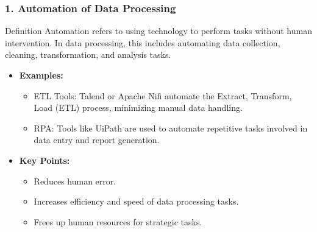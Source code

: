 \documentclass[aspectratio=169]{beamer}
\begin{document}
\begin{frame}[fragile]
    \frametitle{1. Automation of Data Processing}
    \begin{block}{Definition}
        Automation refers to using technology to perform tasks without human intervention. In data processing, this includes automating data collection, cleaning, transformation, and analysis tasks.
    \end{block}
    
    \begin{itemize}
        \item \textbf{Examples:}
        \begin{itemize}
            \item ETL Tools: Talend or Apache Nifi automate the Extract, Transform, Load (ETL) process, minimizing manual data handling.
            \item RPA: Tools like UiPath are used to automate repetitive tasks involved in data entry and report generation.
        \end{itemize}
        
        \item \textbf{Key Points:}
        \begin{itemize}
            \item Reduces human error.
            \item Increases efficiency and speed of data processing tasks.
            \item Frees up human resources for strategic tasks.
        \end{itemize}
    \end{itemize}
\end{frame}
\end{document}
